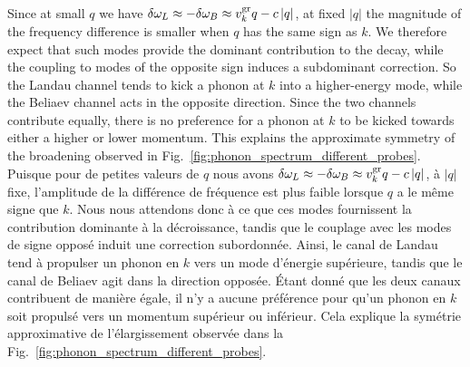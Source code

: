 \documentclass[aps,prd,notitlepage,amsfonts,amssymb,amsmath,nofootinbib,superscriptaddress,longbibliography]{revtex4-2}
\newcommand{\trad}[1]{\textcolor{tradcolor}{#1}}
\begin{document}
Since at small $q$ we have $\delta \omega_{L} \approx -\delta \omega_{B} \approx v^{\rm gr}_k q - c \left|q\right|$, at fixed $\left|q\right|$ the magnitude of the frequency difference is smaller when $q$ has the same sign as $k$. We therefore expect that such modes provide the dominant contribution to the decay, while the coupling to modes of the opposite sign induces a subdominant correction. So the Landau channel tends to kick a phonon at $k$ into a higher-energy mode, while the Beliaev channel acts in the opposite direction. Since the two channels contribute equally, there is no preference for a phonon at $k$ to be kicked towards either a higher or lower momentum.  This explains the approximate symmetry of the broadening  observed in Fig.~\ref{fig:phonon_spectrum_different_probes}.
\trad{Puisque pour de petites valeurs de \( q \) nous avons \(\delta \omega_{L} \approx -\delta \omega_{B} \approx v^{\rm gr}_k q - c \left|q\right|\), à \( \left|q\right| \) fixe, l'amplitude de la différence de fréquence est plus faible lorsque \( q \) a le même signe que \( k \). Nous nous attendons donc à ce que ces modes fournissent la contribution dominante à la décroissance, tandis que le couplage avec les modes de signe opposé induit une correction subordonnée. Ainsi, le canal de Landau tend à propulser un phonon en \( k \) vers un mode d'énergie supérieure, tandis que le canal de Beliaev agit dans la direction opposée. Étant donné que les deux canaux contribuent de manière égale, il n'y a aucune préférence pour qu'un phonon en \( k \) soit propulsé vers un momentum supérieur ou inférieur. Cela explique la symétrie approximative de l'élargissement observée dans la Fig.~\ref{fig:phonon_spectrum_different_probes}.
}
\end{document}

